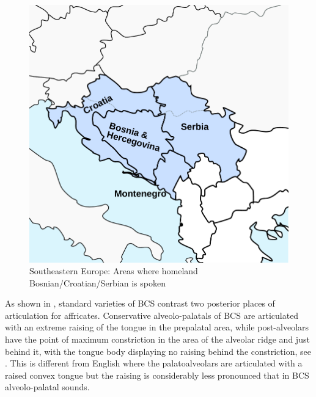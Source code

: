 \documentclass[output=paper,
modfonts,
newtxmath,
hidelinks,
]{langscibook}
\begin{document}
\begin{figure}
\includegraphics[height=.3\textheight]{figures/balkans.pdf}
\caption{\label{fig:mihajlovic:1}Southeastern Europe: Areas where homeland Bosnian/Croatian/Serbian is spoken}
\end{figure}

As shown in , standard varieties of BCS contrast two posterior places of articulation for affricates. Conservative alveolo-palatals of BCS are articulated with an extreme raising of the tongue in the prepalatal area, while post-alveolars have the point of maximum constriction in the area of the alveolar ridge and just behind it, with the tongue body displaying no raising behind the constriction, see . This is different from English where the palatoalveolars are articulated with a raised convex tongue but the raising is considerably less pronounced that in BCS alveolo-palatal sounds.
\end{document}
